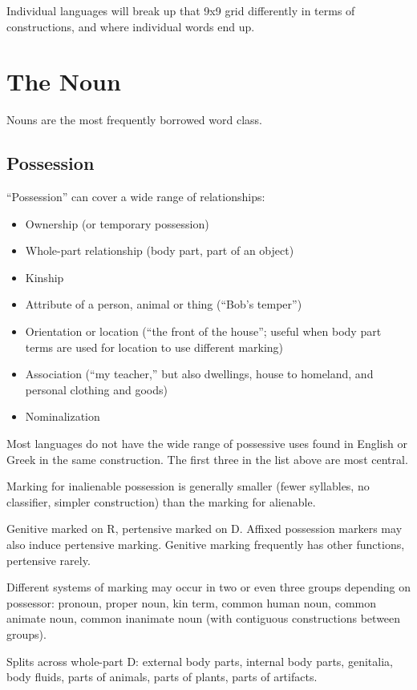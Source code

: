 \documentclass[11pt]{article}
\newenvironment{grammarlist}%
 {\begin{itemize}\addtolength{\itemsep}{-0.5\baselineskip}\ignorespaces}%
 {\end{itemize}\ignorespacesafterend}
\begin{document}
Individual languages will break up that 9x9 grid differently in terms
of constructions, and where individual words end up.


\section{The Noun}
Nouns are the most frequently borrowed word class.

\subsection{Possession}
``Possession'' can cover a wide range of relationships:

\begin{grammarlist}
  \item Ownership (or temporary possession)
  \item Whole-part relationship (body part, part of an object)
  \item Kinship
  \item Attribute of a person, animal or thing (``Bob's temper'')
  \item Orientation or location (``the front of the house''; useful
    when body part terms are used for location to use different
    marking)
  \item Association (``my teacher,'' but also dwellings, house to
    homeland, and personal clothing and goods)
  \item Nominalization
\end{grammarlist}

\noindent Most languages do not have the wide range of possessive uses
found in English or Greek in the same construction.  The first three
in the list above are most central.

Marking for inalienable possession is generally smaller (fewer
syllables, no classifier, simpler construction) than the marking for
alienable.

Genitive marked on R, pertensive marked on D.  Affixed possession
markers may also induce pertensive marking.  Genitive marking
frequently has other functions, pertensive rarely.

Different systems of marking may occur in two or even three groups
depending on possessor: pronoun, proper noun, kin term, common human
noun, common animate noun, common inanimate noun (with contiguous
constructions between groups).

Splits across whole-part D: external body parts, internal body parts,
genitalia, body fluids, parts of animals, parts of plants, parts of
artifacts. 
\end{document}
